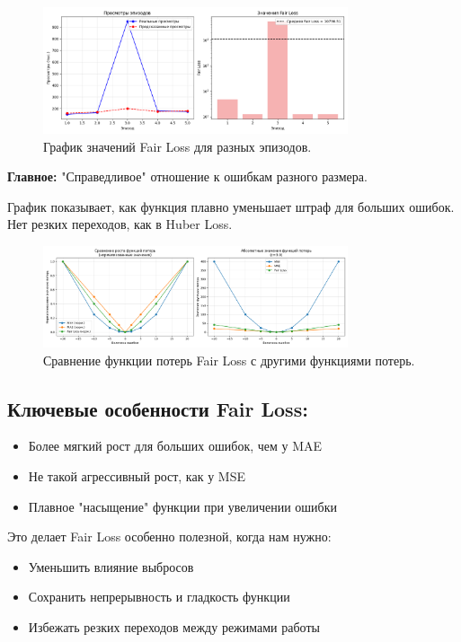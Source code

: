 \begin{figure}[h!]
    \centering
    \includegraphics[width=0.8\textwidth]{chapters/general/imgs/fair.png}
    \caption{График значений Fair Loss для разных эпизодов.}
\end{figure}

\textbf{Главное:} "Справедливое" отношение к ошибкам разного размера.

График показывает, как функция плавно уменьшает штраф для больших ошибок. Нет резких переходов, как в Huber Loss.

\begin{figure}[h!]
    \centering
    \includegraphics[width=0.8\textwidth]{chapters/general/imgs/fair_plus.png}
    \caption{Сравнение функции потерь Fair Loss с другими функциями потерь.}
\end{figure}

\subsection*{Ключевые особенности Fair Loss:}
\begin{itemize}
    \item Более мягкий рост для больших ошибок, чем у MAE
    \item Не такой агрессивный рост, как у MSE
    \item Плавное "насыщение" функции при увеличении ошибки
\end{itemize}

Это делает Fair Loss особенно полезной, когда нам нужно:
\begin{itemize}
    \item Уменьшить влияние выбросов
    \item Сохранить непрерывность и гладкость функции
    \item Избежать резких переходов между режимами работы
\end{itemize}

